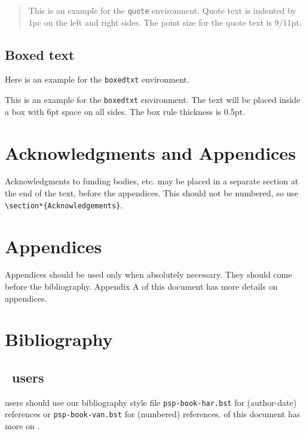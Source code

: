 \begin{quote}
This is an example for the \verb|quote| environment. Quote text is
indented by 1pc on the left and right sides. The point size for the
quote text is 9/11pt.
\end{quote}

\subsection{Boxed text}
Here is an example for the \verb|boxedtxt| environment.

\begin{boxedtxt}
This is an example for the \verb|boxedtxt| environment. The text will be
placed inside a box with 6pt space on all sides. The box rule
thickness is 0.5pt.
\end{boxedtxt}

\section{Acknowledgments and Appendices}
Acknowledgments to funding bodies, etc. may be placed in a separate
section at the end of the text, before the appendices. This should not
be numbered, so use \verb|\section*{Acknowledgements}|.

\section{Appendices}
Appendices should be used only when absolutely necessary. They
should come before the bibliography. Appendix A of this
document has more details on appendices.

\section{Bibliography}

\subsection{\btex\ users}

\btex\index{\btex} users should use our bibliography style file
\verb|psp-book-har.bst| for (author-date) references or
\verb|psp-book-van.bst| for (numbered) references.  of
this document has more on \btex.

